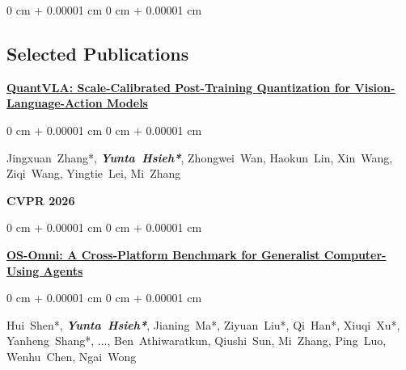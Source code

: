 \documentclass[10pt, letterpaper]{article}
\newenvironment{onecolentry}{
    \begin{adjustwidth}{
        0 cm + 0.00001 cm
    }{
        0 cm + 0.00001 cm
    }
}{
    \end{adjustwidth}
} %
\begin{document}
    
        \begin{samepage}
            \begin{onecolentry}
               \subsection*{Selected Publications}
                \href{https://arxiv.org/pdf/2602.20309}
                {\uline{\textbf{QuantVLA: Scale-Calibrated Post-Training Quantization for Vision-Language-Action Models}}}
            \end{onecolentry}
            
            \vspace{0.10 cm}
            
            \begin{onecolentry}
                \mbox{Jingxuan Zhang*}, 
                \textbf{\textit{\mbox{Yunta Hsieh*}}}, 
                \mbox{Zhongwei Wan}, 
                \mbox{Haokun Lin}, 
                \mbox{Xin Wang}, 
                \mbox{Ziqi Wang}, 
                \mbox{Yingtie Lei}, 
                \mbox{Mi Zhang}
                
                \vspace{0.05 cm}
                \textbf{CVPR 2026}
            \end{onecolentry}
            
            \vspace{0.10 cm}
            
            \begin{onecolentry}
                {\uline{\textbf{OS-Omni: A Cross-Platform Benchmark for Generalist Computer-Using Agents}}}
            \end{onecolentry}
            
            \vspace{0.10 cm}
            
            \begin{onecolentry}
                \mbox{Hui Shen*}, 
                \textbf{\textit{\mbox{Yunta Hsieh*}}}, 
                \mbox{Jianing Ma*}, 
                \mbox{Ziyuan Liu*}, 
                \mbox{Qi Han*}, 
                \mbox{Xiuqi Xu*}, 
                \mbox{Yanheng Shang*}, 
                \mbox{...}, 
                \mbox{Ben Athiwaratkun}, 
                \mbox{Qiushi Sun}, 
                \mbox{Mi Zhang}, 
                \mbox{Ping Luo}, 
                \mbox{Wenhu Chen}, 
                \mbox{Ngai Wong}
                

\end{onecolentry}
\end{samepage}
\end{document}
